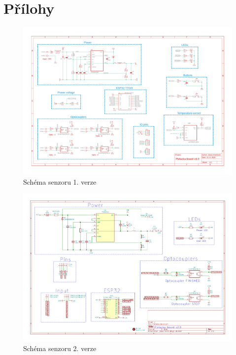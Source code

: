 \chapter{Přílohy}


\begin{figure}[htbp]
    \centering
    \includegraphics[width=\textwidth]{DATASHEET/Pletacka_board_v1.pdf}
    \caption{Schéma senzoru 1. verze}
    \label{fig:Schemav1}
\end{figure}


\begin{figure}[htbp]
    \centering
    \includegraphics[width=\textwidth]{DATASHEET/Pletacka_board_v2.pdf}
    \caption{Schéma senzoru 2. verze}
    \label{fig:Schemav1}
\end{figure}


\newpage